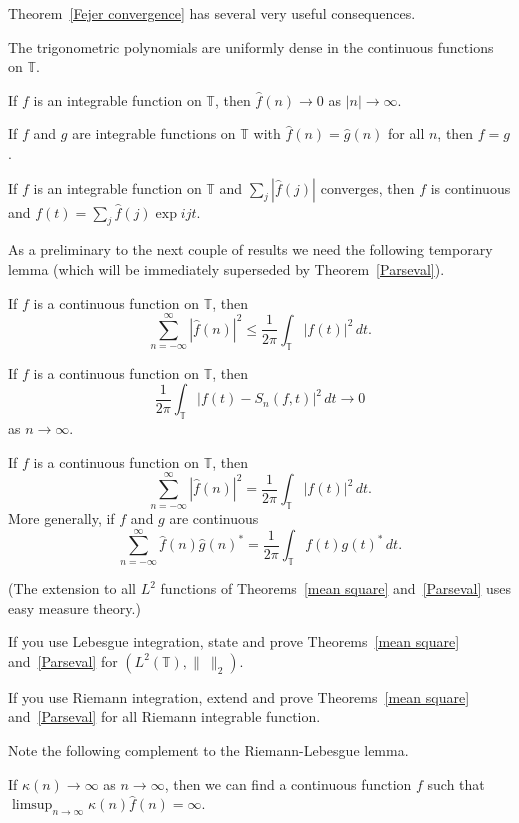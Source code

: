 Theorem~\ref{Fejer convergence} has several very useful
consequences.
\begin{theorem}%
\label{density} The trigonometric polynomials are
uniformly dense in the continuous functions on ${\mathbb T}$.
\end{theorem}
\begin{lemma} If $f$ is an
integrable function on ${\mathbb T}$, then
$\hat{f}(n)\rightarrow 0$ as $|n|\rightarrow\infty$.
\end{lemma}
\begin{theorem}[Uniqueness]\label{Unique}
If $f$ and $g$ are
integrable functions on ${\mathbb T}$ with
$\hat{f}(n)=\hat{g}(n)$ for all $n$, then $f=g$.
\end{theorem}
\begin{lemma} If $f$ is an
integrable function on ${\mathbb T}$ and
$\sum_{j}|\hat{f}(j)|$ converges, then $f$ is continuous
and $f(t)=\sum_{j}\hat{f}(j)\exp ijt$.
\end{lemma}
As a preliminary to the next couple of results we
need the following temporary lemma (which will be immediately
superseded by Theorem~\ref{Parseval}).
\begin{lemma}
If $f$ is
a continuous function on ${\mathbb T}$, then
\[\sum_{n=-\infty}^{\infty}|\hat{f}(n)|^{2}
\leq\frac{1}{2\pi}\int_{\mathbb T}|f(t)|^{2}\,dt.\]
\end{lemma}
\begin{theorem} %
\label{mean square} If $f$ is
a continuous function on ${\mathbb T}$, then
\[
\frac{1}{2\pi}\int_{\mathbb T}
| f(t)-S_{n}(f,t) |^{2}\,dt\rightarrow 0
\]
as $n\rightarrow\infty$.
\end{theorem}
\begin{theorem} \label{Parseval}
If $f$ is
a continuous function on ${\mathbb T}$, then
\[\sum_{n=-\infty}^{\infty}|\hat{f}(n)|^{2}
=\frac{1}{2\pi}\int_{\mathbb T}|f(t)|^{2}\,dt.\]
More generally, if $f$ and $g$ are continuous
\[\sum_{n=-\infty}^{\infty}\hat{f}(n)\hat{g}(n)^{*}
=\frac{1}{2\pi}\int_{\mathbb T}f(t)g(t)^{*}\,dt.\]
\end{theorem}


(The extension to all $L^{2}$ functions of Theorems~\ref{mean square}
and~\ref{Parseval} uses easy measure
theory.)
\begin{exercise}
If you use Lebesgue integration,
state and prove Theorems~\ref{mean square}
and~\ref{Parseval} for $(L^{2}({\mathbb T}),\|\ \|_{2})$.

If you use Riemann integration, extend and prove
Theorems~\ref{mean square} and~\ref{Parseval}
for all Riemann integrable function.
\end{exercise}
Note the following complement to the Riemann-Lebesgue lemma.
\begin{lemma} If
$\kappa(n)\rightarrow \infty$ as $n\rightarrow\infty$,
then we can find a continuous function $f$
such that $\limsup_{n\rightarrow\infty}\kappa(n)\hat{f}(n)=\infty$.
\end{lemma}

